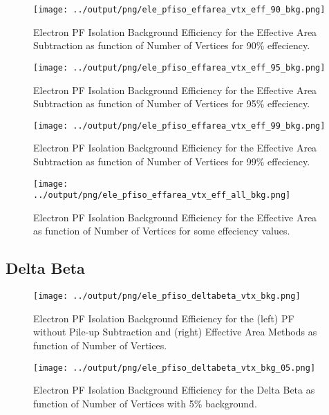\documentclass[11pt]{book}
\begin{document}
\begin{figure}[htb]
\centering
\texttt{[image: ../output/png/ele\_pfiso\_effarea\_vtx\_eff\_90\_bkg.png]}
\caption{Electron PF Isolation Background Efficiency for the Effective Area Subtraction as function of Number of Vertices for 90\% effeciency.}
\label{fig:ele_pfiso_vtx_eff_effarea_eff_90_bkg}
\end{figure}

\begin{figure}[htb]
\centering
\texttt{[image: ../output/png/ele\_pfiso\_effarea\_vtx\_eff\_95\_bkg.png]}
\caption{Electron PF Isolation Background Efficiency for the Effective Area Subtraction as function of Number of Vertices for 95\% effeciency.}
\label{fig:ele_pfiso_vtx_eff_effarea_eff_95_bkg}
\end{figure}

\begin{figure}[htb]
\centering
\texttt{[image: ../output/png/ele\_pfiso\_effarea\_vtx\_eff\_99\_bkg.png]}
\caption{Electron PF Isolation Background Efficiency for the Effective Area Subtraction as function of Number of Vertices for 99\% effeciency.}
\label{fig:ele_pfiso_vtx_eff_effarea_eff_99_bkg}
\end{figure}

\begin{figure}[htb]
\centering
\texttt{[image: ../output/png/ele\_pfiso\_effarea\_vtx\_eff\_all\_bkg.png]}
\caption{Electron PF Isolation Background Efficiency for the Effective Area as function of Number of Vertices for some effeciency values.}
\label{fig:ele_pfiso_vtx_eff_effarea_eff_all_bkg}
\end{figure}
\clearpage

\subsection{Delta Beta}
\begin{figure}[htb]
\centering
\texttt{[image: ../output/png/ele\_pfiso\_deltabeta\_vtx\_bkg.png]}
\caption{Electron PF Isolation Background Efficiency for the (left) PF without Pile-up Subtraction and (right) Effective Area Methods as function of Number of Vertices.}
\label{fig:ele_pfiso_vtx_bkg_deltabeta}
\end{figure}

\begin{figure}[htb]
\centering
\texttt{[image: ../output/png/ele\_pfiso\_deltabeta\_vtx\_bkg\_05.png]}
\caption{Electron PF Isolation Background Efficiency for the Delta Beta as function of Number of Vertices with 5\% background.}
\label{fig:ele_pfiso_vtx_bkg_deltabeta_bkg_05}
\end{figure}
\end{document}
